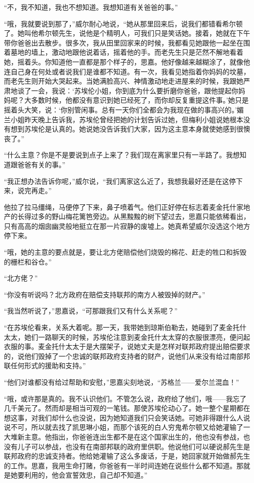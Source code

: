 \par “不，我不知道，我也不想知道。我想知道有关爸爸的事。”
\par “哦，我就要说到那了，”威尔耐心地说，“她从那里回来后，说我们都错看希尔顿了。她叫他希尔顿先生，说他是个精明人，可我们只是笑话她。接着，她就在下午带你爸爸出去散步。很多次，我从田里回家来的时候，我都看见她跟他一起坐在围着墓地的墙上，激动地跟他说着话，摇着他的手。而老先生只是茫然不解地看着她，摇着头。你知道他一直都是那个样子的，思嘉。他好像越来越糊涂了，就像他连自己身在何处或者说我们是谁都不知道。有一次，我看见她指着你妈妈的坟墓，而老先生则开始大哭起来。当她满脸高兴、神情激动地走进屋来的时候，我跟她严肃地谈了一会，我说：‘苏埃伦小姐，你到底为什么要折磨你爸爸，跟他提起你妈妈呢？大多数时候，他都没有意识到她已经死了，而你却反复重提这件事。’她只是摇着头大笑，说：‘你别管闲事。总有一天你们全都会为我现在做的事高兴的。’媚兰小姐昨天晚上告诉我，苏埃伦曾经把她的计划告诉过她，但梅利小姐说她根本没有想到苏埃伦是认真的。她说她没告诉我们大家，因为这主意本身就使她感到很懊丧了。”
\par “什么主意？你是不是要说到点子上来了？我们现在离家里只有一半路了。我想知道跟爸爸有关的事。”
\par “我正想办法告诉你呢，”威尔说，“我们离家这么近了，我想我最好还是在这停下来，说完再走。”
\par 他拉了拉马缰绳，马便停了下来，鼻子喷着气。他们正好停在标志着麦金托什家地产的长得过多的野山梅花篱笆旁边。从黑黢黢的树下望过去，思嘉只能依稀看出，只有高高的烟囱幽灵般地挺立在那一片寂静的废墟上。她真希望威尔没选这个地方停下来。
\par “哦，她的主意的要点就是，要让北方佬赔偿他们烧毁的棉花、赶走的牲口和拆毁的栅栏和谷仓。”
\par “北方佬？”
\par “你没有听说吗？北方政府在赔偿支持联邦的南方人被毁掉的财产。”
\par “我当然听说了，”思嘉说，“可那跟我们又有什么关系呢？”
\par “在苏埃伦看来，关系大着呢。那一天，我带她到琼斯伯勒去，她碰到了麦金托什太太，她们一路聊天的时候，苏埃伦注意到麦金托什太太穿的衣服很漂亮，便问起衣服的事。麦金托什太太于是大摆架子，说她丈夫是怎样对联邦政府提出赔偿要求的，说他们毁掉了一个忠诚的联邦政府支持者的财产，说他们从来没有给过南部邦联任何形式的援助和支持。”
\par “他们对谁都没有给过帮助和安慰，”思嘉尖刻地说，“苏格兰——爱尔兰混血！”
\par “哦，或许那是真的。我不认识他们。不管怎么说，政府给了他们，哦——我忘了几千美元了。然而却是相当可观的一笔钱。那使苏埃伦动心了。她一整个星期都在想这事，对我们却什么也没说，因为她知道我们只会笑话她。可她非得跟什么人说说不可，所以就去找了凯思琳小姐，而那个该死的白人穷鬼希尔顿又给她灌输了一大堆新主意。他指出，你爸爸连出生都不是在这个国家出生的，他也没有参战，也没有儿子可以参战，也没有在南部邦联的政府里供职。他说他们可以硬说郝先生是联邦政府的忠诚支持者。他给她灌输了这么多废话，于是，她回家就开始做郝先生的工作。思嘉，我用生命打赌，你爸爸有一半时间连她在说些什么都不知道。那就是她要利用的，他会宣誓效忠，自己却不知道。”
